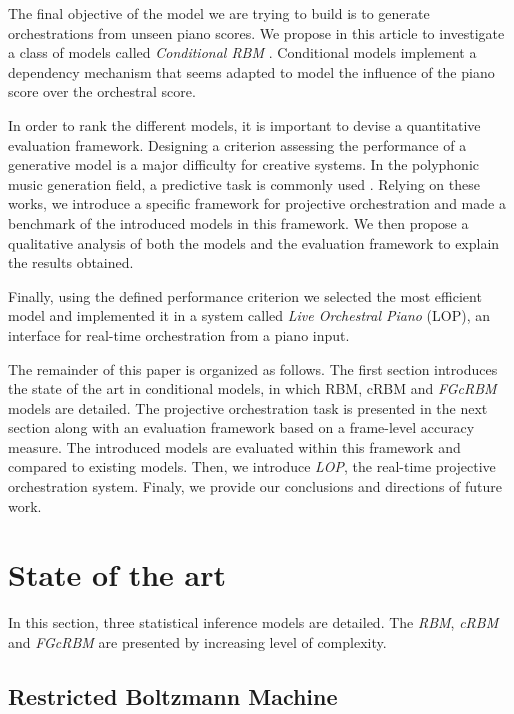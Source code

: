 \documentclass{article}
\begin{document}
The final objective of the model we are trying to build is to generate orchestrations from unseen piano scores.
We propose in this article to investigate a class of models called \textit{Conditional RBM} \cite{taylor2006modeling}. Conditional models implement a dependency mechanism that seems adapted to model the influence of the piano score over the orchestral score.

In order to rank the different models, it is important to devise a quantitative evaluation framework. Designing a criterion assessing the performance of a generative model is a major difficulty for creative systems. In the polyphonic music generation field, a predictive task is commonly used \cite{boulanger2012modeling,lavrenko2003polyphonic,DBLP:journals/corr/YaoCVDD15}. Relying on these works, we introduce a specific framework for projective orchestration and made a benchmark of the introduced models in this framework. We then propose a qualitative analysis of both the models and the evaluation framework to explain the results obtained.

Finally, using the defined performance criterion we selected the most efficient model and implemented it in a system called \textit{Live Orchestral Piano} (LOP), an interface for real-time orchestration from a piano input.

The remainder of this paper is organized as follows. The first section introduces the state of the art in conditional models, in which RBM, cRBM and \textit{FGcRBM} models are detailed. The projective orchestration task is presented in the next section along with an evaluation framework based on a frame-level accuracy measure. The introduced models are evaluated within this framework and compared to existing models. Then, we introduce \textit{LOP}, the real-time projective orchestration system. Finaly, we provide our conclusions and directions of future work.

\section{State of the art}
In this section, three statistical inference models are detailed. The \textit{RBM}, \textit{cRBM} and \textit{FGcRBM} are presented by increasing level of complexity.
\subsection{Restricted Boltzmann Machine}
\end{document}

